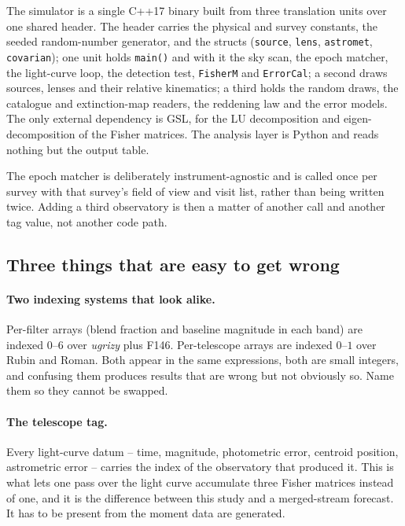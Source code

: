 \documentclass[english,10pt,a4paper]{article}
\begin{document}
	The simulator is a single C++17 binary built from three translation units over one shared header. The header carries the physical and survey constants, the seeded random-number generator, and the structs (\texttt{source}, \texttt{lens}, \texttt{astromet}, \texttt{covarian}); one unit holds \texttt{main()} and with it the sky scan, the epoch matcher, the light-curve loop, the detection test, \texttt{FisherM} and \texttt{ErrorCal}; a second draws sources, lenses and their relative kinematics; a third holds the random draws, the catalogue and extinction-map readers, the reddening law and the error models. The only external dependency is GSL, for the LU decomposition and eigen-decomposition of the Fisher matrices. The analysis layer is Python and reads nothing but the output table.

	The epoch matcher is deliberately instrument-agnostic and is called once per survey with that survey's field of view and visit list, rather than being written twice. Adding a third observatory is then a matter of another call and another tag value, not another code path.

	\subsection{Three things that are easy to get wrong}

	\paragraph{Two indexing systems that look alike.} Per-filter arrays (blend fraction and baseline magnitude in each band) are indexed $0$--$6$ over \textit{ugrizy} plus F146. Per-telescope arrays are indexed $0$--$1$ over Rubin and Roman. Both appear in the same expressions, both are small integers, and confusing them produces results that are wrong but not obviously so. Name them so they cannot be swapped.

	\paragraph{The telescope tag.} Every light-curve datum -- time, magnitude, photometric error, centroid position, astrometric error -- carries the index of the observatory that produced it. This is what lets one pass over the light curve accumulate three Fisher matrices instead of one, and it is the difference between this study and a merged-stream forecast. It has to be present from the moment data are generated.
\end{document}
